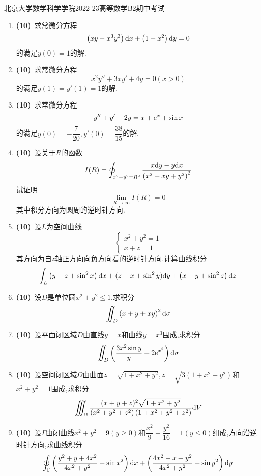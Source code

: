 \documentclass{ctexart}
\begin{document}
\pagestyle{empty}
\begin{center}\Large
    北京大学数学科学学院2022-23高等数学B2期中考试
\end{center}
\begin{enumerate}[leftmargin=*,label=\textbf{\arabic*.}]
    \item \textbf{(10)}\ 求常微分方程
        \[\left(xy-x^3y^3\right)\mathrm{d} x+\left(1+x^2\right)\mathrm{d} y=0\]
        的满足$y(0)=1$的解.
    \item \textbf{(10)}\ 求常微分方程
        \[x^2y''+3xy'+4y=0(x>0)\]
        的满足$y(1)=y'(1)=1$的解.
    \item \textbf{(10)}\ 求常微分方程
        \[y''+y'-2y=x+\mathrm{e}^x+\sin x\]
        的满足$y(0)=-\dfrac{7}{20},y'(0)=\dfrac{38}{15}$的解.
    \item \textbf{(10)}\ 设关于$R$的函数
        \[I(R)=\oint_{x^2+y^2=R^2}\dfrac{x\mathrm{d} y-y\mathrm{d} x}{\left(x^2+xy+y^2\right)^2}\]
        试证明
        \[\lim_{R\to\infty}I(R)=0\]
        其中积分方向为圆周的逆时针方向.
    \item \textbf{(10)}\ 设$L$为空间曲线
        \[\left\{\begin{array}{l}
            x^2+y^2=1\\
            x+z=1
        \end{array}\right.\]
        其方向为自$z$轴正方向向负方向看的逆时针方向.计算曲线积分
        \[\int_{L}\left(y-z+\sin^2x\right)\mathrm{d} x+(z-x+\sin^2y)\mathrm{d} y+\left(x-y+\sin^2z\right)\mathrm{d} z\]

    \item \textbf{(10)}\ 设$D$是单位圆$x^2+y^2\leqslant1$,求积分
        \[\iint_D\left(x+y+xy\right)^2\mathrm{d}\sigma\]

    \item \textbf{(10)}\ 设平面闭区域$D$由直线$y=x$和曲线$y=x^3$围成,求积分
        \[\iint_D\left(\dfrac{3x^2\sin y}{y}+2\mathrm{e}^{x^2}\right)\mathrm{d}\sigma\]

    \item \textbf{(10)}\ 设空间闭区域$\Omega$由曲面$z=\sqrt{1+x^2+y^2},z=\sqrt{3\left(1+x^2+y^2\right)}$和$x^2+y^2=1$围成,求积分
        \[\iiint_{\Omega}\dfrac{(x+y+z)^2\sqrt{1+x^2+y^2}}{\left(x^2+y^2+z^2\right)\left(1+x^2+y^2+z^2\right)}\mathrm{d} V\]

    \item \textbf{(10)}\ 设$\Gamma$由闭曲线$x^2+y^2=9(y\geqslant0)$和$\dfrac{x^2}{9}+\dfrac{y^2}{16}=1(y\leqslant0)$组成,方向沿逆时针方向,求曲线积分
        \[\oint_{\Gamma}\left(\dfrac{y^2+y+4x^2}{4x^2+y^2}+\sin x^2\right)\mathrm{d} x+\left(\dfrac{4x^2-x+y^2}{4x^2+y^2}+\sin y^2\right)\mathrm{d} y\]
    

\end{enumerate}
\end{document}
